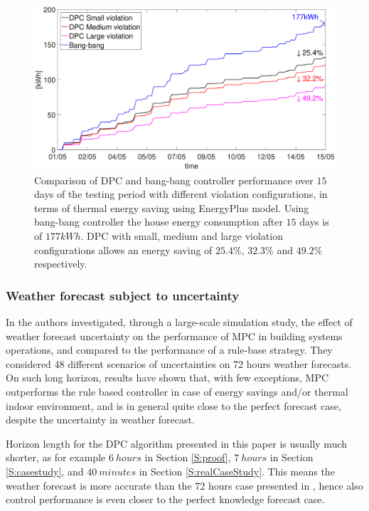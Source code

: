 \begin{figure}[t!]
	\begin{center}
		\includegraphics[width=28pc]{figures/Energy_all_EnergyPlus.eps}
	\end{center}
	\caption{Comparison of DPC and bang-bang controller performance over $15$ days of the testing period with different violation configurations, in terms of thermal energy saving using EnergyPlus model. Using bang-bang controller the house energy consumption after $15$ days is of $177kWh$. DPC with small, medium and large violation configurations allows an energy saving of $25.4\%$, $32.3\%$ and $49.2\%$ respectively.}
	\label{F:comparison_all_energy_E+}
\end{figure}

\textcolor[rgb]{0,0,1}{
\subsubsection{Weather forecast subject to uncertainty}\label{SSS:DisturbanceUncertain}
In \cite{Petersen2014AE} the authors investigated, through a large-scale simulation study, the effect of weather forecast uncertainty on the performance of MPC in building systems operations, and compared to the performance of a rule-base strategy.
They considered 48 different scenarios of uncertainties on 72 hours weather forecasts.
On such long horizon, results have shown that, with few exceptions, MPC outperforms the rule based controller in case of energy savings and/or thermal indoor environment, and is in general quite close to the perfect forecast case, despite the uncertainty in weather forecast.}

\textcolor[rgb]{0,0,1}{Horizon length for the DPC algorithm presented in this paper is usually much shorter, as for example $6\ hours$ in Section \ref{S:proof}, $7\ hours$ in Section \ref{S:casestudy}, and $40\ minutes$ in Section \ref{S:realCaseStudy}. This means the weather forecast is more accurate than the 72 hours case presented in \cite{Petersen2014AE}, hence also control performance is even closer to the perfect knowledge forecast case.}

